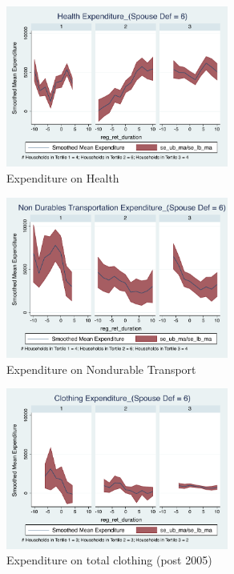\documentclass[11pt,onecolumn]{article}
\numberwithin{figure}{section}
\begin{document}
\begin{figure}[h]
	\caption{Expenditure on Health}
	\centering
	\includegraphics[width=0.65\textwidth]{../ConsumptionPostRetirement_by_SpouseDef_Cats/Smoothed/6/spouse_def_total_healthexpense_real.pdf}
\end{figure}


\begin{figure}[h]
	\caption{Expenditure on Nondurable Transport}
	\centering
	\includegraphics[width=0.65\textwidth]{../ConsumptionPostRetirement_by_SpouseDef_Cats/Smoothed/6/spouse_def_total_transport_real.pdf}
\end{figure}
\clearpage

\begin{figure}[h]
	\caption{Expenditure on total clothing (post 2005)}
	\centering
	\includegraphics[width=0.65\textwidth]{../ConsumptionPostRetirement_by_SpouseDef_Cats/Smoothed/6/spouse_def_total_clothing_2005_real.pdf}
\end{figure}
\end{document}
